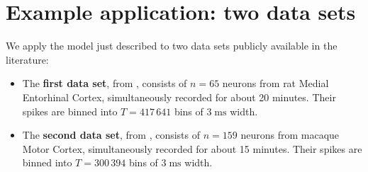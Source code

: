 \documentclass[\ifafour a4paper,12pt,\else a5paper,10pt,\fi%
onecolumn,oneside,article,%
british%
]{memoir}
\theoremstyle{remark}
\theoremstyle{innote}
\renewcommand*{\|}{\nonscript\,\vert\nonscript\;\mathopen{}}
\newcommand*{\yAv}{A}
\newcommand*{\yA}{\yAv}%
\newcommand*{\px}{P_{\text{me}}}
\begin{document}
\section{Example application: two data sets}
\label{sec:application}

We apply the model just described to two data sets publicly available in
the literature:
\begin{itemize}[wide]
\item The \textbf{first data set}, from \textcite[rat
  14147]{stensolaetal2012}, consists of $n=65$ neurons from rat Medial
  Entorhinal Cortex, simultaneously recorded for about 20 minutes. Their
  spikes are binned into $T=417\,641$ bins of $3\;\textrm{ms}$ width.
\item The \textbf{second data set}, from \textcite[supplementary
  material]{rostamietal2016_r2017}, %
  consists of $n=159$ neurons from macaque Motor Cortex, simultaneously
  recorded for about 15 minutes. Their spikes are binned into $T=300\,394$
  bins of $3\;\textrm{ms}$ width.
\end{itemize}


\bigskip
\end{document}

